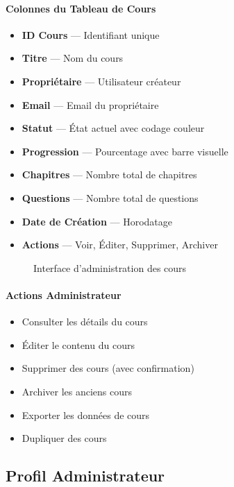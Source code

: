 \documentclass[12pt, a4paper]{report}
\begin{document}
\paragraph{Colonnes du Tableau de Cours}
\begin{itemize}
    \item \textbf{ID Cours} --- Identifiant unique
    \item \textbf{Titre} --- Nom du cours
    \item \textbf{Propriétaire} --- Utilisateur créateur
    \item \textbf{Email} --- Email du propriétaire
    \item \textbf{Statut} --- État actuel avec codage couleur
    \item \textbf{Progression} --- Pourcentage avec barre visuelle
    \item \textbf{Chapitres} --- Nombre total de chapitres
    \item \textbf{Questions} --- Nombre total de questions
    \item \textbf{Date de Création} --- Horodatage
    \item \textbf{Actions} --- Voir, Éditer, Supprimer, Archiver
\end{itemize}

\begin{figure}[H]
    \centering
    \caption{Interface d'administration des cours}
    \label{fig:course-management}
\end{figure}

\paragraph{Actions Administrateur}
\begin{itemize}
    \item Consulter les détails du cours
    \item Éditer le contenu du cours
    \item Supprimer des cours (avec confirmation)
    \item Archiver les anciens cours
    \item Exporter les données de cours
    \item Dupliquer des cours
\end{itemize}

\subsection{Profil Administrateur}
\end{document}

